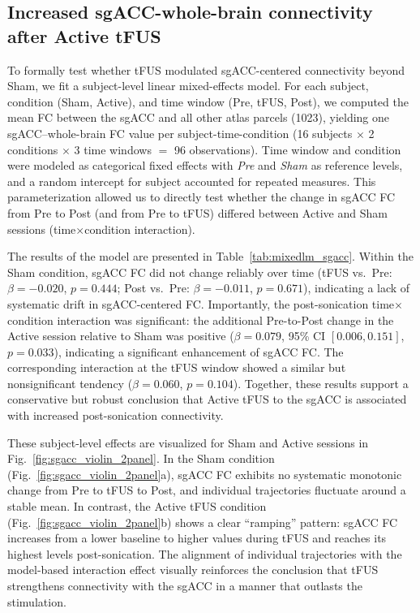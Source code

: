 

\subsection*{Increased sgACC-whole-brain connectivity after Active tFUS}
\noindent 
To formally test whether tFUS modulated sgACC-centered connectivity beyond Sham, we fit a subject-level linear mixed-effects model. For each subject, condition (Sham, Active), and time window (Pre, tFUS, Post), we computed the mean FC between the sgACC and all other atlas parcels (1023), yielding one sgACC--whole-brain FC value per subject-time-condition (16 subjects $\times$ 2 conditions $\times$ 3 time windows $=$ 96 observations). Time window and condition were modeled as categorical fixed effects with \textit{Pre} and \textit{Sham} as reference levels, and a random intercept for subject accounted for repeated measures. This parameterization allowed us to directly test whether the change in sgACC FC from Pre to Post (and from Pre to tFUS) differed between Active and Sham sessions (time$\times$condition interaction).

The results of the model are presented in Table~\ref{tab:mixedlm_sgacc}. Within the Sham condition, sgACC FC did not change reliably over time (tFUS vs.\ Pre: $\beta = -0.020$, $p = 0.444$; Post vs.\ Pre: $\beta = -0.011$, $p = 0.671$), indicating a lack of systematic drift in sgACC-centered FC. Importantly, the post-sonication time$\times$condition interaction was significant: the additional Pre-to-Post change in the Active session relative to Sham was positive ($\beta = 0.079$, 95\% CI $[0.006,0.151]$, $p = 0.033$), indicating a significant enhancement of sgACC FC. The corresponding interaction at the tFUS window showed a similar but nonsignificant tendency ($\beta = 0.060$, $p = 0.104$). Together, these results support a conservative but robust conclusion that Active tFUS to the sgACC is associated with increased post-sonication connectivity. 

These subject-level effects are visualized for Sham and Active sessions in Fig.~\ref{fig:sgacc_violin_2panel}. In the Sham condition (Fig.~\ref{fig:sgacc_violin_2panel}a), sgACC FC exhibits no systematic monotonic change from Pre to tFUS to Post, and individual trajectories fluctuate around a stable mean. In contrast, the Active tFUS condition (Fig.~\ref{fig:sgacc_violin_2panel}b) shows a clear ``ramping'' pattern: sgACC FC increases from a lower baseline to higher values during tFUS and reaches its highest levels post-sonication. The alignment of individual trajectories with the model-based interaction effect visually reinforces the conclusion that tFUS strengthens connectivity with the sgACC in a manner that outlasts the stimulation.

